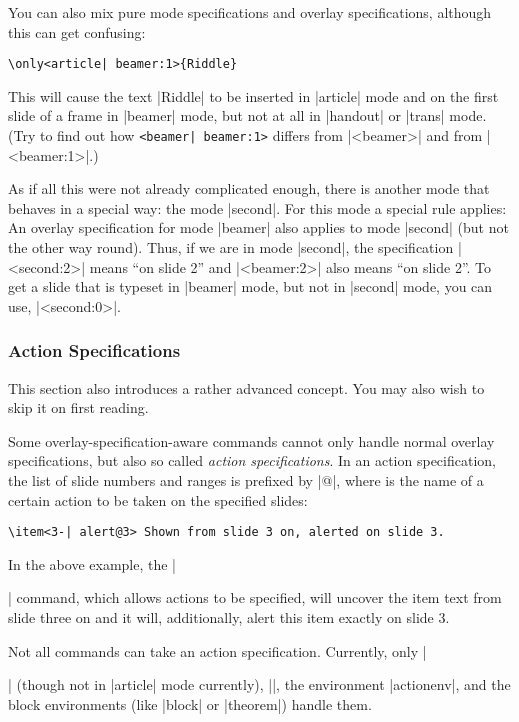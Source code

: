 You can also mix pure mode specifications and overlay specifications, although this can get confusing:
\begin{verbatim}
\only<article| beamer:1>{Riddle}
\end{verbatim}

This will cause the text |Riddle| to be inserted in |article| mode and on the first slide of a frame in |beamer| mode, but not at all in |handout| or |trans| mode. (Try to find out how \verb/<beamer| beamer:1>/ differs from |<beamer>| and from |<beamer:1>|.)

As if all this were not already complicated enough, there is another mode that behaves in a special way: the mode |second|. For this mode a special rule applies: An overlay specification for mode |beamer| also applies to mode |second| (but not the other way round). Thus, if we are in mode |second|, the specification |<second:2>| means ``on slide 2'' and |<beamer:2>| also means ``on slide 2''. To get a slide that is typeset in |beamer| mode, but not in |second| mode, you can use, |<second:0>|.

\subsubsection{Action Specifications}
\label{section-action-specifications}

This section also introduces a rather advanced concept. You may also wish to skip it on first reading.

Some overlay-specification-aware commands cannot only handle normal overlay specifications, but also so called \emph{action specifications}. In an action specification, the list of slide numbers and ranges is prefixed by |@|, where  is the name of a certain action to be taken on the specified slides:
\begin{verbatim}
\item<3-| alert@3> Shown from slide 3 on, alerted on slide 3.
\end{verbatim}

In the above example, the |\item| command, which allows actions to be specified, will uncover the item text from slide three on and it will, additionally, alert this item exactly on slide 3.

Not all commands can take an action specification. Currently, only |\item| (though not in |article| mode currently), |\action|, the environment |actionenv|, and the block environments (like |block| or |theorem|) handle them.


